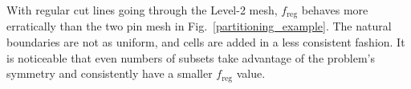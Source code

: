 \documentclass[times,final]{elsarticle}
\begin{document}
\begin{table}[ht]
\centering
\caption{The tabulated results of the parametric study shown in Fig.~\ref{level2_metric_study} with no load balancing, 5 original load balancing iterations (LB), and 5 load-balancing-by-dimension (LBD) iterations for the Level-2 mesh.}
\label{level2_metric_study_table}
\end{table}

With regular cut lines going through the Level-2 mesh, $f_\text{reg}$ behaves more erratically than the two pin mesh in Fig.~\ref{partitioning_example}. The natural boundaries are not as uniform, and cells are added in a less consistent fashion. It is noticeable that even numbers of subsets take advantage of the problem's symmetry and consistently have a smaller $f_\text{reg}$ value.
\end{document}
